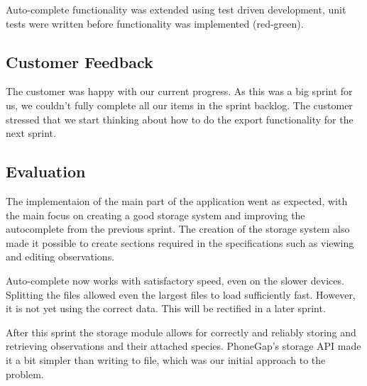 Auto-complete functionality was extended using test driven development, unit
tests were written before functionality was implemented (red-green).

\subsection{Customer Feedback}
The customer was happy with our current progress. As this was a big sprint for
us, we couldn't fully complete all our items in the sprint backlog. The customer
stressed that we start thinking about how to do the export functionality for the
next sprint.

\subsection{Evaluation}
The implementaion of the main part of the application went as expected, with the
main focus on creating a good storage system and improving the autocomplete from
the previous sprint. The creation of the storage system also made it possible to
create sections required in the specifications such as viewing and editing
observations.

Auto-complete now works with satisfactory speed, even on the slower devices. Splitting the files allowed even the largest files to load sufficiently fast. However, it is not yet using the correct data. This will be rectified in a later sprint.

After this sprint the storage module allows for correctly and reliably storing and retrieving observations and their attached species. PhoneGap's storage API made it a bit simpler than writing to file, which was our initial approach to the problem. 
